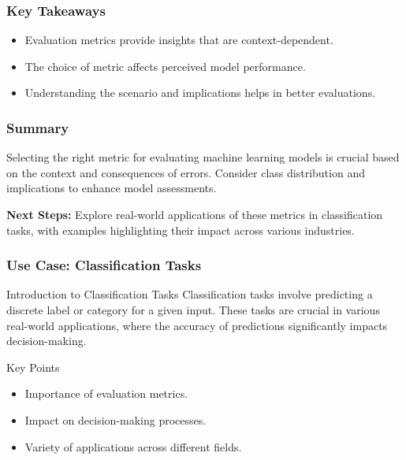 \documentclass[aspectratio=169]{beamer}
\begin{document}
\begin{frame}[fragile]
    \frametitle{Key Takeaways}
    \begin{itemize}
        \item Evaluation metrics provide insights that are context-dependent.
        \item The choice of metric affects perceived model performance.
        \item Understanding the scenario and implications helps in better evaluations.
    \end{itemize}
\end{frame}

\begin{frame}[fragile]
    \frametitle{Summary}
    Selecting the right metric for evaluating machine learning models is crucial based on the context and consequences of errors. Consider class distribution and implications to enhance model assessments.

    \textbf{Next Steps:} Explore real-world applications of these metrics in classification tasks, with examples highlighting their impact across various industries.
\end{frame}

\begin{frame}[fragile]
    \frametitle{Use Case: Classification Tasks}
    \begin{block}{Introduction to Classification Tasks}
        Classification tasks involve predicting a discrete label or category for a given input. These tasks are crucial in various real-world applications, where the accuracy of predictions significantly impacts decision-making.
    \end{block}
    \begin{block}{Key Points}
        \begin{itemize}
            \item Importance of evaluation metrics.
            \item Impact on decision-making processes.
            \item Variety of applications across different fields.
        \end{itemize}
    \end{block}
\end{frame}
\end{document}
